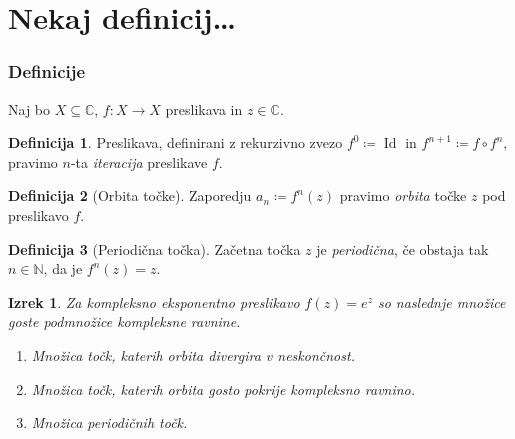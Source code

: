 \documentclass{beamer}
\newcommand{\NN}{\mathbb{N}}
\newcommand{\RR}{\mathbb{R}}
\newcommand{\CC}{\mathbb{C}}
\DeclareMathOperator{\Id}{Id}
\theoremstyle{definition}
\newtheorem{definicija}{Definicija}
\theoremstyle{plain}
\newtheorem{izrek}{Izrek}
\begin{document}



\section{Nekaj definicij\ldots}

\begin{frame}[allowframebreaks]
  \frametitle{Definicije}

  Naj bo \(X \subseteq \CC\), \(f \colon X \to X\) preslikava in \(z \in \CC\).

  \begin{definicija}
    Preslikava, definirani z rekurzivno zvezo \(f^0 \coloneq \Id\) in \(f^{n + 1} \coloneq f \circ f^n\), pravimo \(n\)-ta \emph{iteracija} preslikave \(f\).
  \end{definicija}

  \begin{definicija}[Orbita točke]
    Zaporedju \(a_n \coloneq f^n (z)\) pravimo \emph{orbita} točke \(z\) pod preslikavo \(f\).
  \end{definicija}

  \begin{definicija}[Periodična točka]
    Začetna točka \(z\) je \emph{periodična}, če obstaja tak \(n \in \NN\), da je \(f^n(z) = z\).
  \end{definicija}

  \begin{izrek}
    Za kompleksno eksponentno preslikavo \(f(z) = e^z\) so naslednje množice goste podmnožice kompleksne ravnine.
    \begin{enumerate}
      \item Množica točk, katerih orbita divergira v neskončnost.
      \item Množica točk, katerih orbita gosto pokrije kompleksno ravnino.
      \item Množica periodičnih točk.
    \end{enumerate}
  \end{izrek}

\end{frame}
\end{document}
